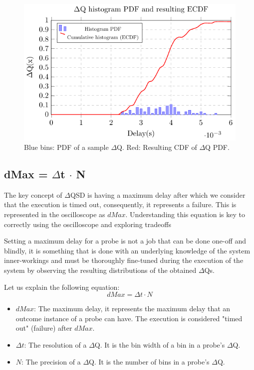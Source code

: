     \begin{figure}[H]
            \begin{center}
                \includegraphics[scale=1]{tikz/pdf_dq.pdf} 
            \end{center}
            \caption{Blue bins: PDF of a sample $\Delta$Q. Red: Resulting CDF of $\Delta$Q PDF.}
        \end{figure}
 
    \subsection{dMax = $\Delta$t $\cdot$ N}
        The key concept of $\Delta$QSD is having a maximum delay after which we consider that the execution is timed out, consequently, it represents a failure. This is represented in the oscilloscope as $dMax$. Understanding this equation is key to correctly using the oscilloscope and exploring tradeoffs

Setting a maximum delay for a probe is not a job that can be done one-off and blindly, it is something that is done with an underlying knowledge of the system inner-workings and must be thoroughly fine-tuned during the execution of the system by observing the resulting distributions of the obtained $\Delta$Qs. 

Let us explain the following equation:
\begin{equation}
    dMax = \Delta t \cdot N  
    \label{eq:dMaxU}
\end{equation}

    \begin{itemize}
        \item $dMax$: The maximum delay, it represents the maximum delay that an outcome instance of a probe can have. The execution is considered "timed out" (failure) after $dMax$.
        \item $\Delta t$: The resolution of a $\Delta$Q. It is the bin width of a bin in a probe's $\Delta$Q.
        \item $N$: The precision of a $\Delta$Q. It is the number of bins in a probe's $\Delta$Q.
    \end{itemize}
    
